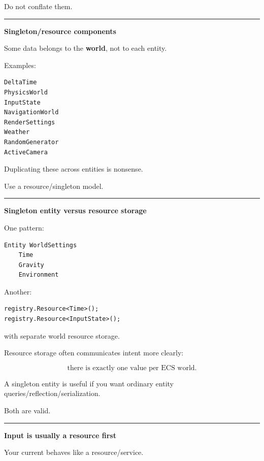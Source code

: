 Do not conflate them.

\begin{center}\rule{0.5\linewidth}{0.5pt}\end{center}

\textbf{Singleton/resource components}

Some data belongs to the \textbf{world}, not to each entity.

Examples:

\begin{verbatim}
DeltaTime
PhysicsWorld
InputState
NavigationWorld
RenderSettings
Weather
RandomGenerator
ActiveCamera
\end{verbatim}

Duplicating these across entities is nonsense.

Use a resource/singleton model.

\begin{center}\rule{0.5\linewidth}{0.5pt}\end{center}

\textbf{Singleton entity versus resource storage}

One pattern:

\begin{verbatim}
Entity WorldSettings
    Time
    Gravity
    Environment
\end{verbatim}

Another:

\begin{verbatim}
registry.Resource<Time>();
registry.Resource<InputState>();
\end{verbatim}

with separate world resource storage.

Resource storage often communicates intent more clearly:

\[
\boxed{
\text{there is exactly one value per ECS world}.
}
\]

A singleton entity is useful if you want ordinary entity queries/reflection/serialization.

Both are valid.

\begin{center}\rule{0.5\linewidth}{0.5pt}\end{center}

\textbf{Input is usually a resource first}

Your current  behaves like a resource/service.

